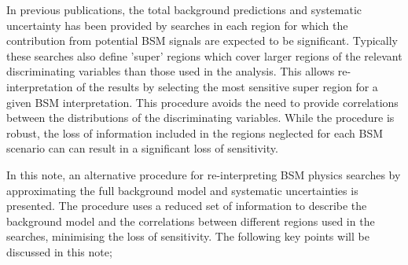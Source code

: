 In previous publications, the total background predictions  
and systematic uncertainty has been provided by searches in each region for which the contribution 
from potential BSM signals are expected to be significant. 
Typically these searches also define 'super' regions which cover larger regions of the relevant discriminating variables 
than those used in the analysis. This allows re-interpretation of the results by selecting the most sensitive 
super region for a given BSM interpretation. This procedure avoids the need to provide correlations between the 
distributions of the discriminating variables. While the procedure is robust, the loss of information included in the regions 
neglected for each BSM scenario can can result in a significant loss of sensitivity. 

In this note, an alternative procedure for re-interpreting BSM physics searches by approximating
the full background model and systematic uncertainties is presented. The procedure uses a reduced 
set of information to describe the background model 
and the correlations between different regions used in the searches, minimising the loss of sensitivity.
The following key points will be discussed in this note;


